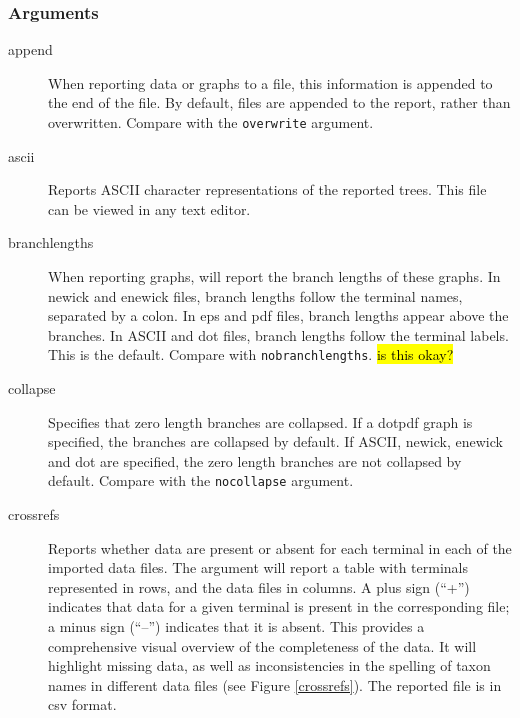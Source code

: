 	\subsubsection{Arguments}
	\begin{description}
		
		\item[append] When reporting data or graphs to a file, this information is 
		appended to the end of the file. By default, files are appended to the report, 
		rather than overwritten. Compare with the \texttt{overwrite} argument.

		\item[ascii] Reports ASCII character representations of the reported trees.
		This file can be viewed in any text editor.
		
		\item[branchlengths] When reporting graphs, \phyg will report the branch 
		lengths of these graphs. In newick and enewick files, branch lengths 
		follow the terminal names, separated by a colon. In eps and pdf files, 
		branch lengths appear above the branches. In ASCII and dot 
		files, branch lengths follow the terminal labels. This is the default. 
		Compare with \texttt{nobranchlengths}. \hl{is this okay?}

		\item[collapse] Specifies that zero length branches are collapsed. If a
		dotpdf graph is specified, the branches are collapsed by default. If ASCII, 
		newick, enewick and dot are specified, the zero length branches are not
		collapsed by default. Compare with the \texttt{nocollapse} argument.
 		
		\item[crossrefs] Reports whether data are present or absent for each terminal 
		in each of the imported data files. The argument will report a table with terminals 
		represented in rows, and the data files in columns. A plus sign (``+'') indicates that 
		data for a given terminal is present in the corresponding file; a minus sign (``--'') 
		indicates that it is absent. This provides a comprehensive visual overview of the 
		completeness of the data. It will highlight missing data, as well as inconsistencies 
		in the spelling of taxon names in different data files (see Figure \ref{crossrefs}).  
		The reported file is in csv format.
		

\end{description}
